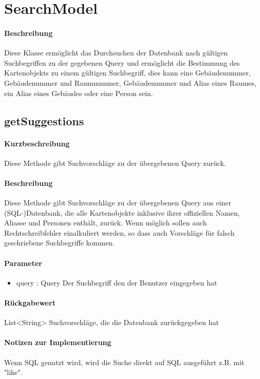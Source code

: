 \section{SearchModel}
\paragraph*{Beschreibung}
Diese Klasse ermöglicht das Durchsuchen der Datenbank nach gültigen Suchbegriffen zu der gegebenen Query 
und ermöglicht die Bestimmung des Kartenobjekts zu einem gültigen Suchbegriff, 
dies kann eine Gebäudenummer, Gebäudenummer und Raumnummer, Gebäudenummer und Alias eines Raumes, ein Alias eines Gebäudes oder eine Person sein.

\subsection{getSuggestions}%
\paragraph*{Kurzbeschreibung}
Diese Methode gibt Suchvorschläge zu der übergebenen Query zurück.
\paragraph*{Beschreibung}
Diese Methode gibt Suchvorschläge zu der übergebenen Query aus einer (SQL-)Datenbank, 
die alle Kartenobjekte inklusive ihrer offiziellen Namen, Aliasse und Personen enthält, zurück.
Wenn möglich sollen auch Rechtschreibfehler einalkuliert werden, so dass auch Vorschläge für falsch geschriebene Suchbegriffe kommen.
\paragraph*{Parameter}
\begin{itemize}
    \item query : Query Der Suchbegriff den der Benutzer eingegeben hat
\end{itemize}
\paragraph*{Rückgabewert}
List<String> Suchvorschläge, die die Datenbank zurückgegeben hat
\paragraph*{Notizen zur Implementierung}
Wenn SQL genutzt wird, wird die Suche direkt auf SQL ausgeführt z.B. mit "like".

